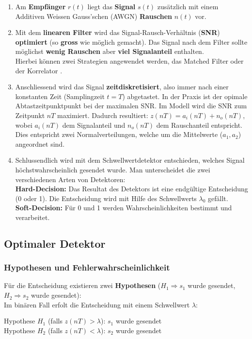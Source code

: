 \begin{enumerate}
  \item Am \textbf{Empfänger} $r(t)$ liegt das \textbf{Signal} $s(t)$ zusätzlich mit einem Additiven 
  		Weissen Gauss'schen (AWGN) \textbf{Rauschen} $n(t)$ vor.
  \item Mit dem \textbf{linearen Filter} wird das Signal-Rausch-Verhältnis (\textbf{SNR})
		\textbf{optimiert} (so \textbf{gross} wie möglich gemacht). Das Signal nach dem Filter sollte
		möglichst \textbf{wenig Rauschen} aber \textbf{viel Signalanteil} enthalten. \\
		Hierbei können zwei Strategien angewendet werden, das Matched Filter 
		 oder der Korrelator
		.
  \item Anschliessend wird das Signal \textbf{zeitdiskretisiert}, also immer nach einer konstanten Zeit
  		(Samplingzeit $t = T$) abgetastet. In der Praxis ist der opimale Abtastzeitpunktpunkt bei der maximalen SNR. Im Modell wird die SNR zum Zeitpunkt $nT$ maximiert. Dadurch resultiert: $z(nT) = a_i(nT) + n_o(nT)$, wobei $a_i(nT)$
  		dem Signalanteil und $n_o(nT)$ dem Rauschanteil entspricht. \\
  		Dies entspricht zwei Normalverteilungen, welche um die Mittelwerte ($a_1, a_2$) angeordnet sind.
  \item Schlussendlich wird mit dem Schwellwertdetektor entschieden, welches Signal
  		höchstwahrscheinlich gesendet wurde. Man unterscheidet die zwei verschiedenen Arten von
  		Detektoren: \\ \textbf{Hard-Decision:} Das Resultat des Detektors ist eine endgültige
  		Entscheidung (0 oder 1). Die Entscheidung wird mit Hilfe des Schwellwerts $\lambda_0$ gefällt.\\ 
  		\textbf{Soft-Decision:} Für 0 und 1 werden Wahrscheinlichkeiten bestimmt und verarbeitet.
\end{enumerate}

\subsection{Optimaler Detektor}
\subsubsection{Hypothesen und Fehlerwahrscheinlichkeit }
	Für die Entscheidung existieren zwei \textbf{Hypothesen} ($H_1 \Rightarrow s_1$ wurde gesendet, 
	$H_2 \Rightarrow s_2$ wurde gesendet): \\ 
	Im binären Fall erfolt die Entscheidung mit einem Schwellwert $\lambda$: \qquad \parbox[c]{10cm}{
	Hypothese $H_1$ (falls $z(nT) > \lambda$): \quad $s_1$ wurde gesendet \\
	Hypothese $H_2$ (falls $z(nT) < \lambda$): \quad $s_2$ wurde gesendet}\\

